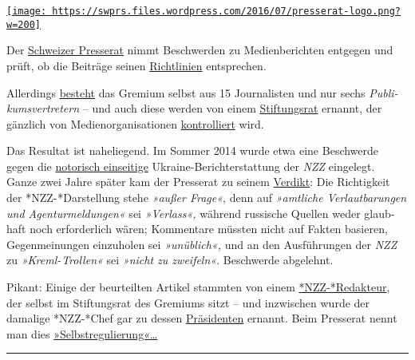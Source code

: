 \href{https://swprs.org/2017/03/01/der-schweizer-presserat/}{\texttt{[image: https://swprs.files.wordpress.com/2016/07/presserat-logo.png?w=200]}}

Der \href{https://presserat.ch/}{Schweizer Presse­rat} nimmt
Be­schwer­den zu Me­dien­be­rich­ten ent­ge­gen und prüft, ob die
Beiträge seinen
\href{https://presserat.ch/journalistenkodex/richtlinien/}{Richt­linien}
ent­spre­chen.

Aller­dings
\href{https://presserat.ch/der-presserat/presseratsmitglieder/}{besteht}
das Gre­mium selbst aus 15 Jour­na­listen und nur sechs
\emph{Pub­li­kums­ver­tre­tern} -- und auch diese werden von einem
\href{https://presserat.ch/der-presserat/stiftungsratsmitglieder/}{Stif‌­tungs­rat}
er­nannt, der gänz­lich von Medien­orga­ni­sa­tionen
\href{https://presserat.ch/der-presserat/geschaeftsreglement/}{kon­trol­liert}
wird.

Das Resultat ist naheliegend. Im Som­mer 2014 wurde etwa eine
Be­schwerde gegen die
\href{https://swprs.org/die-nzz-studie/}{no­to­risch ein­sei­tige}
Ukraine-Bericht­er­stattung der \emph{NZZ} ein­ge­legt. Ganze zwei Jahre
später kam der Presse­rat zu seinem
\href{https://presserat.ch/complaints/wahrheitspflicht-kommentarfreiheit-unterschlagen-wichtiger-informationen-entstellen-von-tatsachen/}{Verdikt}:
Die Rich­tig­keit der *NZZ- *Dar­stel­lung stehe \emph{»außer Frage«},
denn auf \emph{»amt­liche Ver­laut­ba­rungen und Agen­tur­mel­dungen«}
sei \emph{»Verlass«,} während russische Quel­len weder glaub­haf‌t noch
erforderlich wären; Kom­men­tare müss­ten nicht auf Fak­ten ba­sie­ren,
Ge­gen­mei­nungen ein­zu­holen sei \emph{»un­üb­lich«,} und an den
Aus­füh­rungen der \emph{NZZ} zu \emph{»Kreml- Trollen«} sei
\emph{»nicht zu zwei­feln«}. Be­schwerde ab­ge­lehnt.

Pikant: Einige der be­ur­teil­ten Ar­tikel stam­mten von einem
\href{http://www.nzz.ch/international/europa/beschwerde-beim-presserat-kritik-an-nzz-abgewiesen-ld.104814}{*NZZ-*Redak­teur},
der selbst im Stif‌­tungs­rat des Gremiums sitzt -- und inzwischen wurde
der damalige *NZZ-*Chef gar zu dessen
\href{http://www.nzz.ch/schweiz/medien-selbstregulierung-markus-spillmann-wird-praesident-des-presserats-ld.135619}{Prä­si­denten}
ernannt. Beim Presse­rat nennt man dies
\href{https://de.wikipedia.org/wiki/Schweizer_Presserat}{»Selbst­re­gu­lierung«\ldots{}}

\begin{center}\rule{0.5\linewidth}{\linethickness}\end{center}

